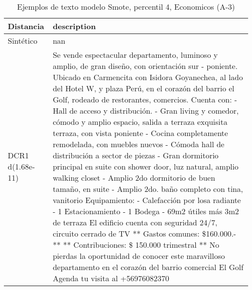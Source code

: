 \begin{table}[H]
\centering
\fontsize{10}{14}\selectfont
\caption{Ejemplos de texto modelo Smote, percentil 4, Economicos (A-3)}
\label{table-example-economicos-a-3-smote-enc-4p-text}
\begin{tabular}{|l|m{35em}|}
\hline
\rowcolor[gray]{0.8}
Distancia & description \\
\hline Sintético & nan \\
\hline DCR1 d(1.68e-11) & Se vende espectacular departamento, luminoso y amplio, de gran dise\~no, con orientaci\'on sur - poniente. Ubicado en Carmencita con Isidora Goyanechea, al lado del Hotel W, y plaza Per\'u, en el coraz\'on del barrio el Golf, rodeado de restorantes, comercios.
   Cuenta con: - Hall de acceso y distribuci\'on. - Gran living y comedor, c\'omodo y amplio espacio, salida a terraza exquisita terraza, con vista poniente - Cocina completamente remodelada, con muebles nuevos  - C\'omoda hall de distribuci\'on a sector de piezas - Gran dormitorio principal en suite con shower door, luz natural, amplio walking closet
 - Amplio 2do dormitorio de buen tama\~no, en suite  - Amplio 2do. ba\~no completo con tina, vanitorio  Equipamiento: - Calefacci\'on por losa radiante - 1 Estacionamiento - 1 Bodega - 69m2 \'utiles m\'as 3m2 de terraza  El edificio cuenta con seguridad 24/7, circuito cerrado de TV   ** Gastos comunes: \$160.000.- ** ** Contribuciones: \$ 150.000 trimestral **  No pierdas la oportunidad de conocer este maravilloso departamento en el coraz\'on del barrio comercial El Golf Agenda tu visita al +56976082370 \\

\end{tabular}
\end{table}

